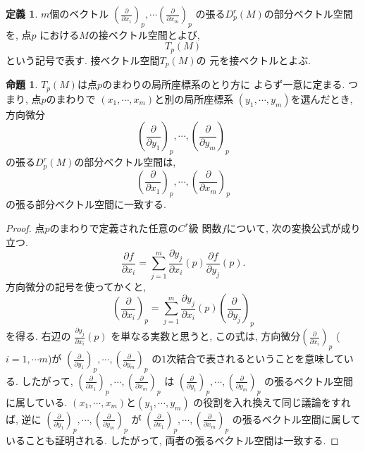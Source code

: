 \documentclass[a4j,12pt]{jarticle}
\theoremstyle{definition}
\newtheorem{definition}[theorem]{定義}
\newtheorem{proposition}[theorem]{命題}
\begin{document}
    \begin{definition}\label{def:tangent vector space}
        $m$個のベクトル
        $\left(\frac{\partial}{\partial x_1}\right)_p, 
        \cdots 
        \left(\frac{\partial}{\partial x_m}\right)_p$
        の張る$D_p^r(M)$の部分ベクトル空間を, 点$p$
        における$M$の接ベクトル空間とよび, 
        $$T_p(M)$$
        という記号で表す. 接ベクトル空間$T_p(M)$の
        元を接ベクトルとよぶ. 
    \end{definition}
    \begin{proposition}
        $T_p(M)$は点$p$のまわりの局所座標系のとり方に
        よらず一意に定まる. つまり, 点$p$のまわりで
        $(x_1,\cdots ,x_m)$と別の局所座標系
        $(y_1,\cdots ,y_m)$を選んだとき, 
        方向微分
        $$\left(\frac{\partial}{\partial y_1}\right)_p, 
        \cdots ,
        \left(\frac{\partial}{\partial y_m}\right)_p$$
        の張る$D_p^r(M)$の部分ベクトル空間は, 
        $$\left(\frac{\partial}{\partial x_1}\right)_p, 
        \cdots ,
        \left(\frac{\partial}{\partial x_m}\right)_p$$
        の張る部分ベクトル空間に一致する. 
    \end{proposition}
    \begin{proof}
        点$p$のまわりで定義された任意の$C^r$級
        関数$f$について, 次の変換公式が成り立つ. 
        $$\frac{\partial f}{\partial x_i}
        =\sum_{j=1}^{m}\frac{\partial y_j}
        {\partial x_i}(p)
        \frac{\partial f}{\partial y_j}(p).$$
        方向微分の記号を使ってかくと, 
        $$\left(\frac{\partial}{\partial x_i}\right)_p=
        \sum_{j=1}^{m}
        \frac{\partial y_j}{\partial x_i}(p)
        \left(\frac{\partial}{\partial y_j}\right)_p$$
        を得る. 右辺の
        $\frac{\partial y_j}{\partial x_i}(p)$
        を単なる実数と思うと, この式は, 
        方向微分$\left(\frac{\partial}{\partial x_i}\right)_p$
        ($i=1,\cdots m$)が
        $\left(\frac{\partial}{\partial y_1}\right)_p, \cdots 
        ,\left(\frac{\partial}{\partial y_m}\right)_p$
        の$1$次結合で表されるということを意味している. 
        したがって, 
        $\left(\frac{\partial}{\partial x_1}\right)_p, \cdots 
        ,\left(\frac{\partial}{\partial x_m}\right)_p$
        は
        $\left(\frac{\partial}{\partial y_1}\right)_p, \cdots 
        ,\left(\frac{\partial}{\partial y_m}\right)_p$
        の張るベクトル空間に属している. 
        $(x_1,\cdots ,x_m)$と$(y_1,\cdots ,y_m)$
        の役割を入れ換えて同じ議論をすれば, 逆に
        $\left(\frac{\partial}{\partial y_1}\right)_p, \cdots 
        ,\left(\frac{\partial}{\partial y_m}\right)_p$
        が
        $\left(\frac{\partial}{\partial x_1}\right)_p, \cdots 
        ,\left(\frac{\partial}{\partial x_m}\right)_p$
        の張るベクトル空間に属していることも証明される. 
        したがって, 両者の張るベクトル空間は一致する. 
    \end{proof}
\end{document}
